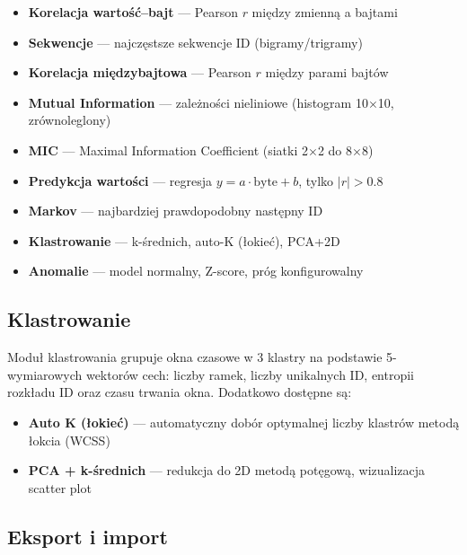 \documentclass[a4paper,12pt]{article}
\begin{document}
\begin{itemize}[nosep]
    \item \textbf{Korelacja wartość--bajt} — Pearson $r$ między zmienną a bajtami
    \item \textbf{Sekwencje} — najczęstsze sekwencje ID (bigramy/trigramy)
    \item \textbf{Korelacja międzybajtowa} — Pearson $r$ między parami bajtów
    \item \textbf{Mutual Information} — zależności nieliniowe (histogram 10$\times$10, zrównoleglony)
    \item \textbf{MIC} — Maximal Information Coefficient (siatki 2$\times$2 do 8$\times$8)
    \item \textbf{Predykcja wartości} — regresja $y = a\cdot\mathrm{byte} + b$, tylko $|r| > 0.8$
    \item \textbf{Markov} — najbardziej prawdopodobny następny ID
    \item \textbf{Klastrowanie} — k-średnich, auto-K (łokieć), PCA+2D
    \item \textbf{Anomalie} — model normalny, Z-score, próg konfigurowalny
\end{itemize}

\subsection{Klastrowanie}

Moduł klastrowania grupuje okna czasowe w 3 klastry na podstawie 5-wymiarowych wektorów cech: liczby ramek, liczby unikalnych ID, entropii rozkładu ID oraz czasu trwania okna. Dodatkowo dostępne są:

\begin{itemize}[nosep]
    \item \textbf{Auto K (łokieć)} — automatyczny dobór optymalnej liczby klastrów metodą łokcia (WCSS)
    \item \textbf{PCA + k-średnich} — redukcja do 2D metodą potęgową, wizualizacja scatter plot
\end{itemize}

\subsection{Eksport i import}
\end{document}
